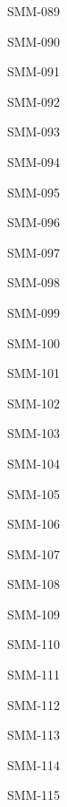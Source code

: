 \documentclass[]{article}
\begin{document}
\begin{center}
\begin{labels}
SMM-089


SMM-090


SMM-091


SMM-092


SMM-093


SMM-094


SMM-095


SMM-096


SMM-097


SMM-098


SMM-099


SMM-100


SMM-101


SMM-102


SMM-103


SMM-104


SMM-105


SMM-106


SMM-107


SMM-108


SMM-109


SMM-110


SMM-111


SMM-112


SMM-113


SMM-114


SMM-115


\end{labels}
\end{center}
\end{document}

